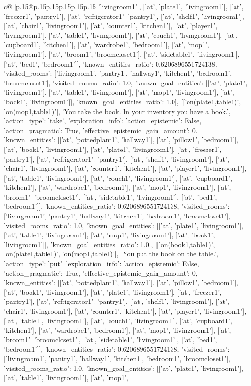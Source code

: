 \documentclass{article}
\begin{document}
{\begin{supertabular}{c@{$\;$}|p{.15\linewidth}@{}p{.15\linewidth}p{.15\linewidth}p{.15\linewidth}p{.15\linewidth}p{.15\linewidth}}
{{{'livingroom1'], ['at', 'plate1', 'livingroom1'], ['at', 'freezer1', 'pantry1'], ['at', 'refrigerator1', 'pantry1'], ['at', 'shelf1', 'livingroom1'], ['at', 'chair1', 'livingroom1'], ['at', 'counter1', 'kitchen1'], ['at', 'player1', 'livingroom1'], ['at', 'table1', 'livingroom1'], ['at', 'couch1', 'livingroom1'], ['at', 'cupboard1', 'kitchen1'], ['at', 'wardrobe1', 'bedroom1'], ['at', 'mop1', 'livingroom1'], ['at', 'broom1', 'broomcloset1'], ['at', 'sidetable1', 'livingroom1'], ['at', 'bed1', 'bedroom1']], 'known_entities_ratio': 0.6206896551724138, 'visited_rooms': ['livingroom1', 'pantry1', 'hallway1', 'kitchen1', 'bedroom1', 'broomcloset1'], 'visited_rooms_ratio': 1.0, 'known_goal_entities': [['at', 'plate1', 'livingroom1'], ['at', 'table1', 'livingroom1'], ['at', 'mop1', 'livingroom1'], ['at', 'book1', 'livingroom1']], 'known_goal_entities_ratio': 1.0}}], [['on(plate1,table1)', 'on(mop1,table1)'], 'You take the book. In your inventory you have a book.', {'action_type': 'take', 'exploration_info': {'action_epistemic': False, 'action_pragmatic': True, 'effective_epistemic_gain_amount': 0, 'known_entities': [['at', 'pottedplant1', 'hallway1'], ['at', 'pillow1', 'bedroom1'], ['at', 'book1', 'livingroom1'], ['at', 'plate1', 'livingroom1'], ['at', 'freezer1', 'pantry1'], ['at', 'refrigerator1', 'pantry1'], ['at', 'shelf1', 'livingroom1'], ['at', 'chair1', 'livingroom1'], ['at', 'counter1', 'kitchen1'], ['at', 'player1', 'livingroom1'], ['at', 'table1', 'livingroom1'], ['at', 'couch1', 'livingroom1'], ['at', 'cupboard1', 'kitchen1'], ['at', 'wardrobe1', 'bedroom1'], ['at', 'mop1', 'livingroom1'], ['at', 'broom1', 'broomcloset1'], ['at', 'sidetable1', 'livingroom1'], ['at', 'bed1', 'bedroom1']], 'known_entities_ratio': 0.6206896551724138, 'visited_rooms': ['livingroom1', 'pantry1', 'hallway1', 'kitchen1', 'bedroom1', 'broomcloset1'], 'visited_rooms_ratio': 1.0, 'known_goal_entities': [['at', 'plate1', 'livingroom1'], ['at', 'table1', 'livingroom1'], ['at', 'mop1', 'livingroom1'], ['at', 'book1', 'livingroom1']], 'known_goal_entities_ratio': 1.0}}], [['on(book1,table1)', 'on(plate1,table1)', 'on(mop1,table1)'], 'You put the book on the table.', {'action_type': 'put', 'exploration_info': {'action_epistemic': False, 'action_pragmatic': True, 'effective_epistemic_gain_amount': 0, 'known_entities': [['at', 'pottedplant1', 'hallway1'], ['at', 'pillow1', 'bedroom1'], ['at', 'book1', 'livingroom1'], ['at', 'plate1', 'livingroom1'], ['at', 'freezer1', 'pantry1'], ['at', 'refrigerator1', 'pantry1'], ['at', 'shelf1', 'livingroom1'], ['at', 'chair1', 'livingroom1'], ['at', 'counter1', 'kitchen1'], ['at', 'player1', 'livingroom1'], ['at', 'table1', 'livingroom1'], ['at', 'couch1', 'livingroom1'], ['at', 'cupboard1', 'kitchen1'], ['at', 'wardrobe1', 'bedroom1'], ['at', 'mop1', 'livingroom1'], ['at', 'broom1', 'broomcloset1'], ['at', 'sidetable1', 'livingroom1'], ['at', 'bed1', 'bedroom1']], 'known_entities_ratio': 0.6206896551724138, 'visited_rooms': ['livingroom1', 'pantry1', 'hallway1', 'kitchen1', 'bedroom1', 'broomcloset1'], 'visited_rooms_ratio': 1.0, 'known_goal_entities': [['at', 'plate1', 'livingroom1'], ['at', 'table1', 'livingroom1'], ['at', 'mop1', }}}
\end{supertabular}}
\end{document}
